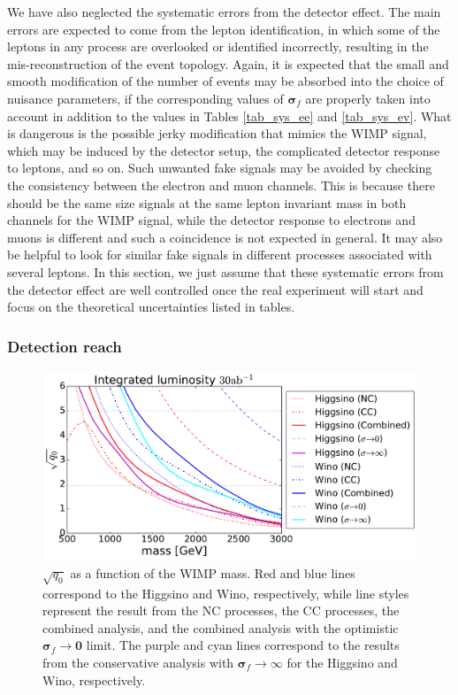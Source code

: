\documentclass[12pt,twoside,book]{article}
\begin{document}
We have also neglected the systematic errors from the detector effect.
The main errors are expected to come from the lepton identification, in which some of the leptons in any process are overlooked or identified incorrectly, resulting in the mis-reconstruction of the event topology.
Again, it is expected that the small and smooth modification of the number of events may be absorbed into the choice of nuisance parameters, if the corresponding values of $\bm{\sigma}_f$ are properly taken into account in addition to the values in Tables
\ref{tab_sys_ee} and \ref{tab_sys_ev}.
What is dangerous is the possible jerky modification that mimics the WIMP signal, which may be induced by the detector setup, the complicated detector response to leptons, and so on.
Such unwanted fake signals may be avoided by checking the consistency between the electron and muon channels.
This is because there should be the same size signals at the same lepton invariant mass in both channels for the WIMP signal, while the detector response to electrons and muons is different and such a coincidence is not expected in general.
It may also be helpful to look for similar fake signals in different processes associated with several leptons.
In this section, we just assume that these systematic errors from the detector effect are well controlled once the real experiment will start and focus on the theoretical uncertainties listed in tables.


\subsubsection{Detection reach}
\label{sec_detection}

\begin{figure}[t]
  \centering
  \includegraphics[width=0.7\hsize]{mchi_vs_sqq0.pdf}
  \caption{
    $\sqrt{q_0}$ as a function of the WIMP mass.
    Red and blue lines correspond to the Higgsino and Wino, respectively, while line styles represent the result from the NC processes, the CC processes, the combined analysis, and the combined analysis with the optimistic $\bm{\sigma}_f \to \bm{0}$ limit.
    The purple and cyan lines correspond to the results from the conservative analysis with $\bm{\sigma}_f \to \infty$ for the Higgsino and Wino, respectively.
  }
  \label{fig_mchi_vs_sqq0}
\end{figure}
\end{document}
